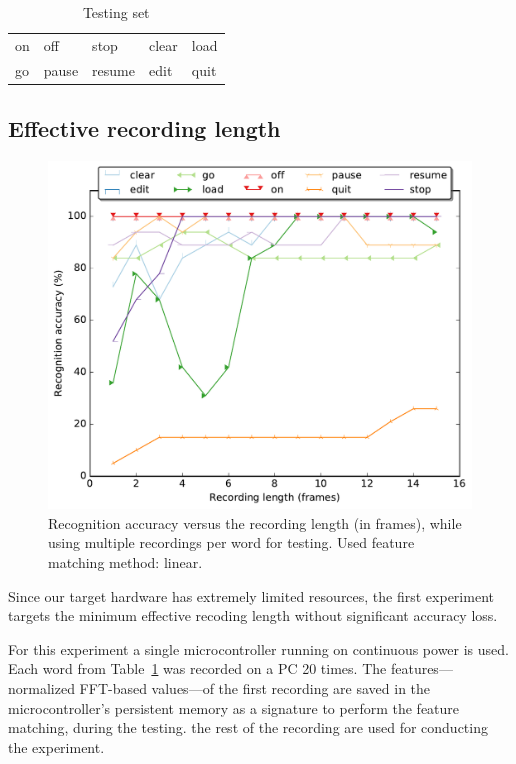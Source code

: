 \begin{table}[H]
\centering
\caption{Testing set}
\label{tab:words}
\begin{tabular}{lllll}
\hline
on    & off  & stop & clear & load   \\
go & pause & resume & edit  & quit  \\  
\hline  
\end{tabular}
\end{table}

\subsection{Effective recording length}
\label{subsec:rec_length}
%
\begin{figure}
	\centering
	\includegraphics[width=\linewidth]{"figures/linear_multi"}
	\caption{Recognition accuracy versus the recording length (in frames), while using multiple recordings per word for testing. Used feature matching method: linear.}
	\label{fig:multi}
\end{figure}
%
Since our target hardware has extremely limited resources, the first experiment targets the minimum effective recoding length without significant accuracy loss. 

For this experiment a single microcontroller running on continuous power is used. Each word from Table~\ref{tab:words} was recorded on a PC 20 times. The features---normalized FFT-based values---of the first recording are saved in the microcontroller's persistent memory as a signature to perform the feature matching, during the testing. the rest of the recording are used for conducting the experiment.   

